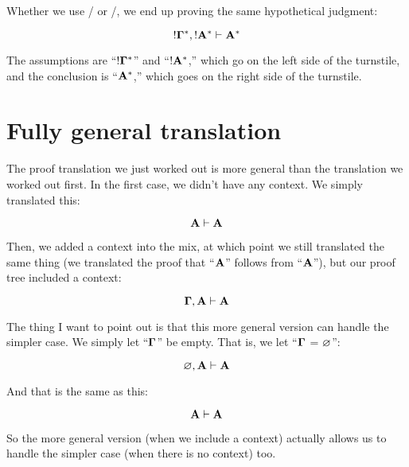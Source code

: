 \documentclass[../../../main.tex]{subfiles}
\begin{document}
\noindent
Whether we use \bangCopy/ or \bangDer/, we end up proving the same hypothetical judgment:

\begin{equation*}
  \bang/\nd{\context/}^{*}, \bang/\nd{A}^{*} \ndturnstile/ \nd{A}^{*}
\end{equation*}

\noindent
The assumptions are ``$\bang/\nd{\context/}^{*}$'' and ``$\bang/\nd{A}^{*}$,'' which go on the left side of the turnstile, and the conclusion is ``$\mathbf{A}^{*}$,'' which goes on the right side of the turnstile.


\section{Fully general translation}

The proof translation we just worked out is more general than the translation we worked out first. In the first case, we didn't have any context. We simply translated this:

\begin{equation*}
  \nd{A} \ndturnstile/ \nd{A}
\end{equation*}

\noindent
Then, we added a context into the mix, at which point we still translated the same thing (we translated the proof that ``$\mathbf{A}$'' follows from ``$\mathbf{A}$''), but our proof tree included a context:

\begin{equation*}
  \nd{\context/}, \nd{A} \ndturnstile/ \nd{A}
\end{equation*}

\noindent
The thing I want to point out is that this more general version can handle the simpler case. We simply let ``$\nd{\context/}$'' be empty. That is, we let ``$\nd{\context/}$ = $\emptyassumptions/$'':

\begin{equation*}
  \emptyassumptions/, \nd{A} \ndturnstile/ \nd{A}
\end{equation*} 

\noindent
And that is the same as this:

\begin{equation*}
  \nd{A} \ndturnstile/ \nd{A}
\end{equation*} 

\noindent
So the more general version (when we include a context) actually allows us to handle the simpler case (when there is no context) too.
\end{document}

